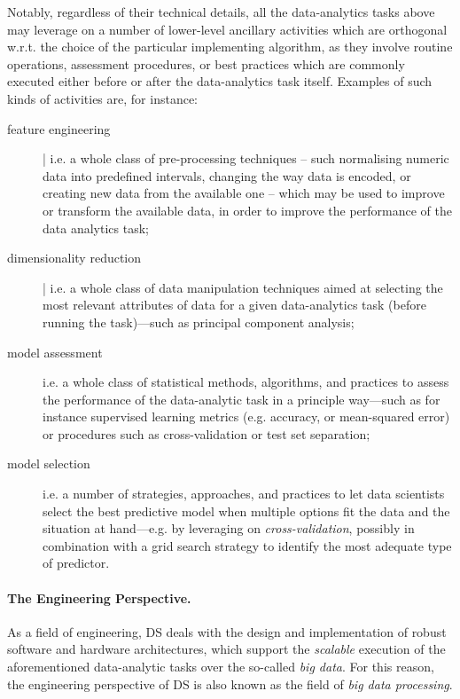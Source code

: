 \documentclass[12pt,a4paper,openright,twoside]{book}
\begin{document}
Notably, regardless of their technical details, all the data-analytics tasks above may leverage on a number of lower-level ancillary activities which are orthogonal w.r.t. the choice of the particular implementing algorithm, as they involve routine operations, assessment procedures, or best practices which are commonly executed either before or after the data-analytics task itself.
%
Examples of such kinds of activities are, for instance:
%
\begin{description}
    \item[feature engineering] | i.e. a whole class of pre-processing techniques -- such normalising numeric data into predefined intervals, changing the way data is encoded, or creating new data from the available one -- which may be used to improve or transform the available data, in order to improve the performance of the data analytics task;
    \item[dimensionality reduction] | i.e. a whole class of data manipulation techniques aimed at selecting the most relevant attributes of data for a given data-analytics task (before running the task)---such as principal component analysis;
    \item[model assessment] i.e. a whole class of statistical methods, algorithms, and practices to assess the performance of the data-analytic task in a principle way---such as for instance supervised learning metrics (e.g. accuracy, or mean-squared error) or procedures such as cross-validation or test set separation;
    \item[model selection] i.e. a number of strategies, approaches, and practices to let data scientists select the best predictive model when multiple options fit the data and the situation at hand---e.g. by leveraging on \emph{cross-validation}, possibly in combination with a grid search strategy to identify the most adequate type of predictor.
\end{description}
%
%

\paragraph{The Engineering Perspective.}

As a field of engineering, DS deals with the design and implementation of robust software and hardware architectures, which support the \emph{scalable} execution of the aforementioned data-analytic tasks over the so-called \emph{big data}.
%
For this reason, the engineering perspective of DS is also known as the field of \emph{big data processing}.
\end{document}
